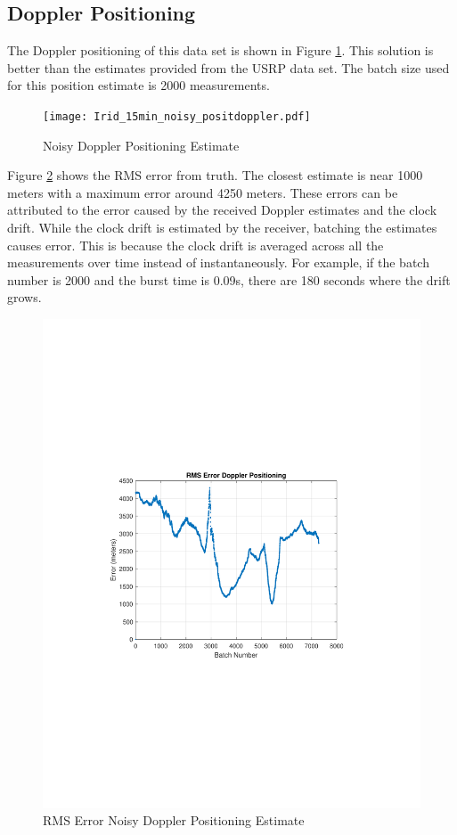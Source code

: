 \documentclass[12pt]{report}
\begin{document}
\subsection{Doppler Positioning}
The Doppler positioning of this data set is shown in Figure \ref{fig:DirtyDoppler15minIridPosit}. This solution is better than the estimates provided from the USRP data set. The batch size used for this position estimate is 2000 measurements. 
\begin{figure}[h!]
    \centering
    \texttt{[image: Irid\_15min\_noisy\_positdoppler.pdf]}
    \caption{Noisy Doppler Positioning Estimate}
    \label{fig:DirtyDoppler15minIridPosit}
\end{figure}

Figure \ref{fig:DirtyDoppler15minIridPositrmse} shows the RMS error from truth. The closest estimate is near 1000 meters with a maximum error around 4250 meters. These errors can be attributed to the error caused by the received Doppler estimates and the clock drift. While the clock drift is estimated by the receiver, batching the estimates causes error. This is because the clock drift is averaged across all the measurements over time instead of instantaneously. For example, if the batch number is 2000 and the burst time is 0.09s, there are 180 seconds where the drift grows. 

\begin{figure}[h!]
    \centering
    \includegraphics[trim=1.2in 3.3in 1.75in 3.3in,clip,width=5in]
    {Irid_15min_noisy_RMSEdoppler.pdf}
    \caption{RMS Error Noisy Doppler Positioning Estimate}
    \label{fig:DirtyDoppler15minIridPositrmse}
\end{figure}
\end{document}
